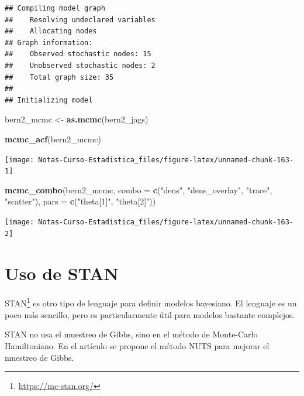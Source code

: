 \documentclass[
  12pt,
]{book}
\newenvironment{Shaded}{\begin{snugshade}}{\end{snugshade}}
\newcommand{\DataTypeTok}[1]{\textcolor[rgb]{0.13,0.29,0.53}{#1}}
\newcommand{\KeywordTok}[1]{\textcolor[rgb]{0.13,0.29,0.53}{\textbf{#1}}}
\newcommand{\NormalTok}[1]{#1}
\newcommand{\StringTok}[1]{\textcolor[rgb]{0.31,0.60,0.02}{#1}}
\theoremstyle{definition}
\theoremstyle{definition}
\theoremstyle{definition}
\theoremstyle{remark}
\begin{document}
\begin{verbatim}
## Compiling model graph
##    Resolving undeclared variables
##    Allocating nodes
## Graph information:
##    Observed stochastic nodes: 15
##    Unobserved stochastic nodes: 2
##    Total graph size: 35
## 
## Initializing model
\end{verbatim}

\begin{Shaded}
\begin{Highlighting}[]
\NormalTok{bern2_mcmc <-}\StringTok{ }\KeywordTok{as.mcmc}\NormalTok{(bern2_jags)}

\KeywordTok{mcmc_acf}\NormalTok{(bern2_mcmc)}
\end{Highlighting}
\end{Shaded}

\begin{center}\texttt{[image: Notas-Curso-Estadistica\_files/figure-latex/unnamed-chunk-163-1]} \end{center}

\begin{Shaded}
\begin{Highlighting}[]
\KeywordTok{mcmc_combo}\NormalTok{(bern2_mcmc, }\DataTypeTok{combo =} \KeywordTok{c}\NormalTok{(}\StringTok{"dens"}\NormalTok{, }\StringTok{"dens_overlay"}\NormalTok{, }
    \StringTok{"trace"}\NormalTok{, }\StringTok{"scatter"}\NormalTok{), }\DataTypeTok{pars =} \KeywordTok{c}\NormalTok{(}\StringTok{"theta[1]"}\NormalTok{, }\StringTok{"theta[2]"}\NormalTok{))}
\end{Highlighting}
\end{Shaded}

\begin{center}\texttt{[image: Notas-Curso-Estadistica\_files/figure-latex/unnamed-chunk-163-2]} \end{center}

\hypertarget{uso-de-stan}{%
\section{Uso de STAN}\label{uso-de-stan}}

STAN\footnote{\url{https://mc-stan.org/}} es otro tipo de lenguaje para definir modelos bayesiano. El lenguaje es un poco más sencillo, pero es particularmente útil para modelos bastante complejos.

STAN no usa el muestreo de Gibbs, sino en el método de Monte-Carlo Hamiltoniano. En el artículo \autocite{Hoffman2014} se propone el método NUTS para mejorar el muestreo de Gibbs.
\end{document}
